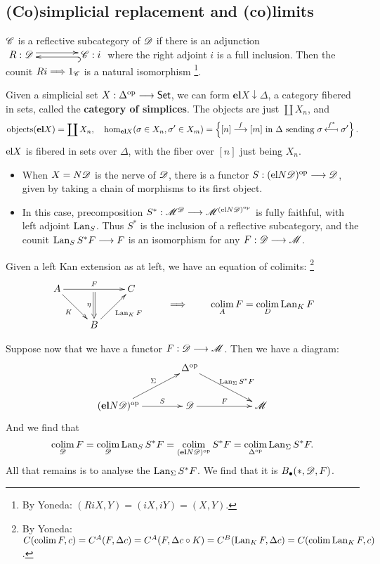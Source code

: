 \documentclass[11pt]{article}
\begin{document}
\begin{5. The unreasonably effective (co)bar construction}
\subsection*{(Co)simplicial replacement and (co)limits}
\begin{itemise}
\setlength{\parindent}{.25in}
\item $\mathscr{C}$ is a reflective subcategory of $\mathscr{D}$ if there is an adjunction
$\xymatrix@R=.3cm@C=1.5cm{
R:\scrd  \ar@<.6ex>[r]&
\scrc:i  \ar@{^{(}->}@<.4ex>[l]
}$
where the right adjoint $i$ is a full inclusion. Then the counit $Ri\Longrightarrow 1_{\mathscr{C}}$ is a natural isomorphism%
\footnote{By Yoneda: $(RiX,Y)=(iX,iY)=(X,Y)$.}.
\item Given a simplicial set $X:\Delta^{\textup{op}}\longrightarrow\operatorname{{\mathsf{Set}}}$, we can form $\textbf{el}X\downarrow\Delta$, a category fibered in sets, called the \textbf{category of simplices}. The objects are just $\coprod X_n$, and
\[\textup{objects}(\textbf{el}X)=\coprod X_n,\quad \textup{hom}_{\textbf{el}X}(\sigma\in X_n,\sigma'\in X_m)=\left\{\textup{$[n]\overset{f}{\to}[m]$ in $\Delta$ sending $\sigma\overset{f^*}{\mapsfrom}\sigma'$}\right\}.\]
$\textup{el}X$ is fibered in sets over $\Delta$, with the fiber over $[n]$ just being $X_n$.
\begin{itemize}\squishlist
\setlength{\parindent}{.25in}
\item When $X=N\mathscr{D}$ is the nerve of $\mathscr{D}$, there is a functor $S:(\textup{el}N\mathscr{D})^{\textup{op}}\longrightarrow\mathscr{D}$, given by taking a chain of morphisms to its first object.
\item In this case, precomposition $S^*:\mathscr{M}^{\mathscr{D}}\longrightarrow \mathscr{M}^{(\textup{el}N\mathscr{D})^{\textup{op}}}$ is fully faithful, with left adjoint $\operatorname{Lan}_S$. Thus $S^*$ is the inclusion of a reflective subcategory, and the counit $\operatorname{Lan}_SS^*F\longrightarrow F$ is an isomorphism for any $F:\mathscr{D}\longrightarrow\mathscr{M}$.
\end{itemize}
\item Given a left Kan extension as at left, we have an equation of colimits:%
\footnote{By Yoneda: $C(\operatorname*{colim} F,c)=C^A(F,\Delta c)=C^A(F,\Delta c\circ K)=C^B(\operatorname{Lan}_KF,\Delta c)=C(\operatorname*{colim} \operatorname{Lan}_KF,c)$.}
\[\vcenter{\xymatrix{
A\ar[rd]_-{K}\ar[rr]^-{F}_-{}="arF"&%
&%
C\\%
&%
B\ar@{->}[ur]_{\Lan_KF}\ar@{=>}"arF";[]_-{\eta}&%
}}\qquad\implies\qquad  \colim_AF=\colim_D\Lan_KF\]
\end{itemise}
Suppose now that we have a functor $F:\mathscr{D}\longrightarrow\mathscr{M}$. Then we have a diagram:
\[\xymatrix@!C{
&%
\Delta^{\op}
\ar[rd]^-{\Lan_\Sigma S^*F}
&%
\\%
(\textbf{el}N\scrd)^{\op}
\ar[ur]^-{\Sigma}
\ar[r]^-{S}
&%
\scrd
\ar[r]^-{F}
&%
\scrm%
}\]
And we find that
\[\operatorname*{colim}_{\mathscr{D}}F=\operatorname*{colim}_{\mathscr{D}}\operatorname{Lan}_S S^*F= \operatorname*{colim}_{(\textbf{el}N\mathscr{D})^{\textup{op}}}S^*F= \operatorname*{colim}_{\Delta^{\textup{op}}}\operatorname{Lan}_\Sigma S^*F. \]
All that remains is to analyse the $\operatorname{Lan}_\Sigma S^*F$. We find that it is $B_\bullet (*,\mathscr{D},F)$.
\end{5. The unreasonably effective (co)bar construction}
\end{document}
